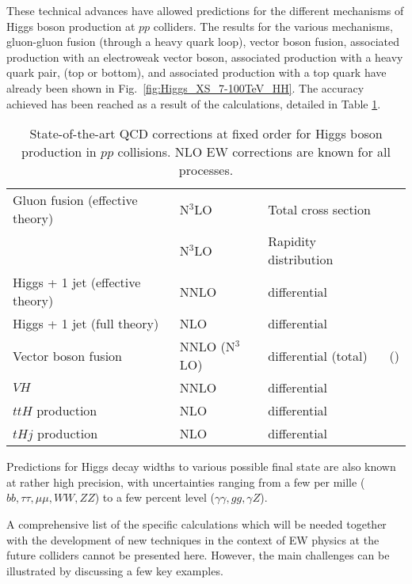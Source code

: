 \documentclass[../report.tex]{subfiles}
\newcommand{\ew}{electroweak\xspace}
\begin{document}
These technical advances have allowed predictions for the different mechanisms of Higgs boson production at $pp$ colliders. The results for the various mechanisms, gluon-gluon fusion (through a heavy quark loop), vector boson fusion, associated production with an \ew vector boson, associated production with a heavy quark pair, (top or bottom), and associated production with a top quark have already been shown in Fig.~\ref{fig:Higgs_XS_7-100TeV_HH}. The accuracy achieved has been reached as a result of the calculations, detailed in Table \ref{tab:StateofArt}.
\begin{table}
\begin{center}
\caption{State-of-the-art QCD corrections at fixed order for Higgs boson production in $pp$ collisions.  NLO EW corrections are known for all processes.  }
\label{tab:StateofArt}
\begin{tabular}{|l|l|l|l|}
\hline
Gluon fusion (effective theory)  & N$^{3}$LO & Total cross section & \cite{Mistlberger:2018etf,Dulat:2018rbf} \\
                                 & N$^{3}$LO & Rapidity distribution  & \cite{Dulat:2018bfe,Cieri:2018oms} \\
\hline 
Higgs + 1 jet (effective theory)   & NNLO & differential & \cite{Chen:2016zka}  \\
Higgs + 1 jet (full  theory)       & NLO  & differential & \cite{Jones:2018hbb} \\
\hline
Vector boson fusion   & NNLO (N$^{3}$LO) & differential (total) & \cite{Cruz-Martinez:2018dvl,Cacciari:2015jma,Figy:2007kv} (\cite{Dreyer:2016oyx})\\
\hline
$VH$   & NNLO & differential & \cite{Ferrera:2017zex,Caola:2017xuq} \\
\hline
$ttH$ production & NLO & differential  & \cite{Reina:2001sf,Beenakker:2002nc,Yu:2014cka} \\
$tHj$  production & NLO & differential  & \cite{Farina:2012xp,Demartin:2015uha} \\
\hline
\end{tabular}
\end{center}
\end{table}
%
Predictions for Higgs decay widths to various possible final state are also known at rather high precision, with uncertainties ranging from a few per mille ($bb,\tau\tau,\mu\mu,WW,ZZ$) to a few percent level ($\gamma\gamma,gg,\gamma Z$). 

A comprehensive list of the specific calculations which will be needed together with the development of new techniques in the context of EW physics at the future colliders cannot be presented here. However, the main challenges can be illustrated by discussing a few key examples. 
\end{document}
